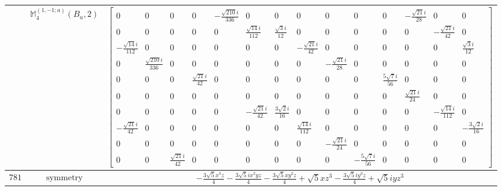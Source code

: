 \documentclass[fleqn,8pt,landscape]{jsarticle}
\begin{document}
\begin{longtable}{ccc}
$  $ & $ \mathbb{M}_{4}^{(1,-1;a)}(B_{u},2) $ & $ \begin{bmatrix} 0 & 0 & 0 & 0 & - \frac{\sqrt{210} i}{336} & 0 & 0 & 0 & 0 & 0 & 0 & - \frac{\sqrt{21} i}{28} & 0 & 0 \\ 0 & 0 & 0 & 0 & 0 & \frac{\sqrt{14} i}{112} & \frac{\sqrt{3} i}{12} & 0 & 0 & 0 & 0 & 0 & - \frac{\sqrt{21} i}{42} & 0 \\ - \frac{\sqrt{14} i}{112} & 0 & 0 & 0 & 0 & 0 & 0 & - \frac{\sqrt{21} i}{42} & 0 & 0 & 0 & 0 & 0 & \frac{\sqrt{3} i}{12} \\ 0 & \frac{\sqrt{210} i}{336} & 0 & 0 & 0 & 0 & 0 & 0 & - \frac{\sqrt{21} i}{28} & 0 & 0 & 0 & 0 & 0 \\ 0 & 0 & 0 & \frac{\sqrt{21} i}{42} & 0 & 0 & 0 & 0 & 0 & 0 & \frac{5 \sqrt{7} i}{56} & 0 & 0 & 0 \\ 0 & 0 & 0 & 0 & 0 & 0 & 0 & 0 & 0 & 0 & 0 & \frac{\sqrt{21} i}{24} & 0 & 0 \\ 0 & 0 & 0 & 0 & 0 & - \frac{\sqrt{21} i}{42} & \frac{3 \sqrt{2} i}{16} & 0 & 0 & 0 & 0 & 0 & - \frac{\sqrt{14} i}{112} & 0 \\ - \frac{\sqrt{21} i}{42} & 0 & 0 & 0 & 0 & 0 & 0 & \frac{\sqrt{14} i}{112} & 0 & 0 & 0 & 0 & 0 & - \frac{3 \sqrt{2} i}{16} \\ 0 & 0 & 0 & 0 & 0 & 0 & 0 & 0 & - \frac{\sqrt{21} i}{24} & 0 & 0 & 0 & 0 & 0 \\ 0 & 0 & \frac{\sqrt{21} i}{42} & 0 & 0 & 0 & 0 & 0 & 0 & - \frac{5 \sqrt{7} i}{56} & 0 & 0 & 0 & 0 \end{bmatrix} $ \\ \hline
$ 781 $ & $ \text{symmetry} $ & $ - \frac{3 \sqrt{5} x^{3} z}{4} - \frac{3 \sqrt{5} i x^{2} y z}{4} - \frac{3 \sqrt{5} x y^{2} z}{4} + \sqrt{5} x z^{3} - \frac{3 \sqrt{5} i y^{3} z}{4} + \sqrt{5} i y z^{3} $ \\

\end{longtable}
\end{document}
